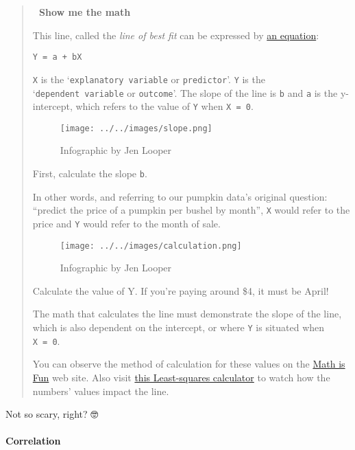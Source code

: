\documentclass[
]{article}
\begin{document}
\begin{quote}
\textbf{🧮 Show me the math}

This line, called the \emph{line of best fit} can be expressed by
\href{https://en.wikipedia.org/wiki/Simple_linear_regression}{an
equation}:

\begin{verbatim}
Y = a + bX
\end{verbatim}

\texttt{X} is the `\texttt{explanatory\ variable} or
\texttt{predictor}'. \texttt{Y} is the `\texttt{dependent\ variable} or
\texttt{outcome}'. The slope of the line is \texttt{b} and \texttt{a} is
the y-intercept, which refers to the value of \texttt{Y} when
\texttt{X\ =\ 0}.

\begin{figure}
\centering
\texttt{[image: ../../images/slope.png]}
\caption{Infographic by Jen Looper}
\end{figure}

First, calculate the slope \texttt{b}.

In other words, and referring to our pumpkin data's original question:
``predict the price of a pumpkin per bushel by month'', \texttt{X} would
refer to the price and \texttt{Y} would refer to the month of sale.

\begin{figure}
\centering
\texttt{[image: ../../images/calculation.png]}
\caption{Infographic by Jen Looper}
\end{figure}

Calculate the value of Y. If you're paying around \$4, it must be April!

The math that calculates the line must demonstrate the slope of the
line, which is also dependent on the intercept, or where \texttt{Y} is
situated when \texttt{X\ =\ 0}.

You can observe the method of calculation for these values on the
\href{https://www.mathsisfun.com/data/least-squares-regression.html}{Math
is Fun} web site. Also visit
\href{https://www.mathsisfun.com/data/least-squares-calculator.html}{this
Least-squares calculator} to watch how the numbers' values impact the
line.
\end{quote}

Not so scary, right? 🤓

\hypertarget{correlation}{%
\paragraph{Correlation}\label{correlation}}
\end{document}
